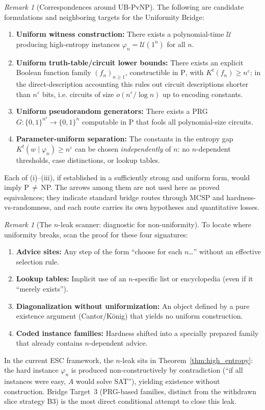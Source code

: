 \documentclass[aps,prd,twocolumn,superscriptaddress,nofootinbib]{revtex4-2}
\theoremstyle{definition}
\theoremstyle{remark}
\newtheorem{remark}[theorem]{Remark}
\begin{document}
\begin{remark}[Correspondences around UB-PvNP]\label{rem:ub-equivalences}
The following are candidate formulations and neighboring targets for the Uniformity Bridge:
\begin{enumerate}
\item[(i)] \textbf{Uniform witness construction:} There exists a polynomial-time $\mathcal{U}$ producing high-entropy instances $\varphi_n = \mathcal{U}(1^n)$ for all $n$.
\item[(ii)] \textbf{Uniform truth-table/circuit lower bounds:} There exists an explicit Boolean function family $(f_n)_{n \geq 1}$, constructible in $\mathrm{P}$, with $K^t(f_n) \geq n^\varepsilon$; in the direct-description accounting this rules out circuit descriptions shorter than $n^\varepsilon$ bits, i.e. circuits of size $o(n^\varepsilon/\log n)$ up to encoding constants.
\item[(iii)] \textbf{Uniform pseudorandom generators:} There exists a PRG $G: \{0,1\}^{n^\delta} \to \{0,1\}^n$ computable in $\mathrm{P}$ that fools all polynomial-size circuits.
\item[(iv)] \textbf{Parameter-uniform separation:} The constants in the entropy gap $K^t(w \mid \varphi_n) \geq n^\varepsilon$ can be chosen \emph{independently} of $n$: no $n$-dependent thresholds, case distinctions, or lookup tables.
\end{enumerate}
Each of (i)--(iii), if established in a sufficiently strong and uniform form, would imply P$\,\neq\,$NP. The arrows among them are not used here as proved equivalences; they indicate standard bridge routes through MCSP and hardness-vs-randomness, and each route carries its own hypotheses and quantitative losses.
\end{remark}

\begin{remark}[The $n$-leak scanner: diagnostic for non-uniformity]\label{rem:n-leak}
To locate where uniformity breaks, scan the proof for these four signatures:
\begin{enumerate}
\item \textbf{Advice sites:} Any step of the form ``choose for each $n$\ldots'' without an effective selection rule.
\item \textbf{Lookup tables:} Implicit use of an $n$-specific list or encyclopedia (even if it ``merely exists'').
\item \textbf{Diagonalization without uniformization:} An object defined by a pure existence argument (Cantor/König) that yields no uniform construction.
\item \textbf{Coded instance families:} Hardness shifted into a specially prepared family that already contains $n$-dependent advice.
\end{enumerate}
In the current ESC framework, the $n$-leak sits in Theorem~\ref{thm:high_entropy}: the hard instance $\varphi_n$ is produced non-constructively by contradiction (``if all instances were easy, $A$ would solve SAT''), yielding existence without construction. Bridge Target~3 (PRG-based families, distinct from the withdrawn slice strategy B3) is the most direct conditional attempt to close this leak.
\end{remark}
\end{document}
